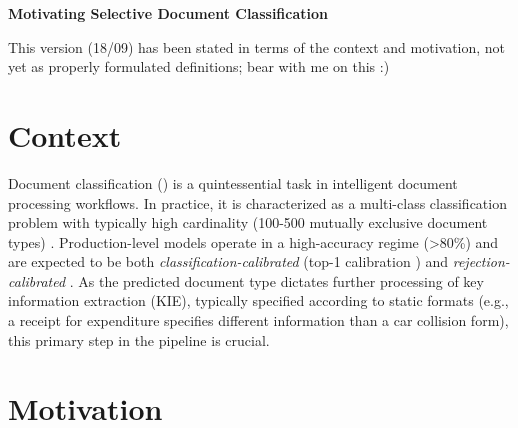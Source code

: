 


\newpage

\begin{center}{\noindent\Large\bf Motivating Selective Document Classification}\end{center}

\begin{uuredbox}
This version (18/09) has been stated in terms of the context and motivation, not yet as properly formulated definitions; bear with me on this :) 
\end{uuredbox}

\section{Context}

Document classification (\DC) is a quintessential task in intelligent document processing workflows. In practice, it is characterized as a multi-class classification problem with typically high cardinality (100-500 mutually exclusive document types) \cite{vanlandeghem2023document}. Production-level \DC{} models operate in a high-accuracy regime (>80\%) and are expected to be both \textit{classification-calibrated} \cite[Definition 1]{ni2019calibration} (top-1 calibration \cite{naeini2015obtaining,guo2017calibration,vaicenavicius2019evaluating}) and \textit{rejection-calibrated} \cite[Definition 2]{ni2019calibration}. As the predicted document type dictates further processing of key information extraction (KIE), typically specified according to static formats (e.g., a receipt for expenditure specifies different information than a car collision form), this primary step in the pipeline is crucial. 


\section{Motivation}


